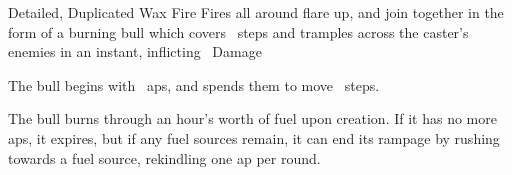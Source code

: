   {Detailed, Duplicated}%
  {Wax}%
  {Fire}%
  {}%
  {Fires all around flare up, and join together in the form of a burning bull which covers ~\glspl{step} and tramples across the caster's enemies in an instant, inflicting \showDam\ Damage}%
  {
  The bull begins with ~\glspl{ap}, and spends them to move ~\glspl{step}.

  The bull burns through an hour's worth of fuel upon creation.
  If it has no more \glspl{ap}, it expires, but if any fuel sources remain, it can end its rampage by rushing towards a fuel source, rekindling one \gls{ap} per \gls{round}.
  }

